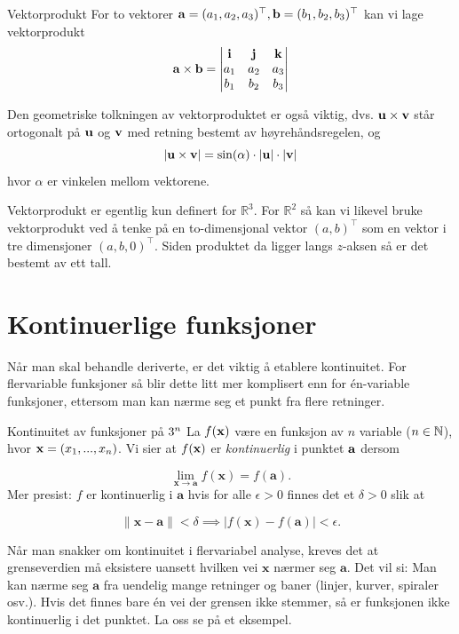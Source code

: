 \begin{defn}{Vektorprodukt}
For to vektorer $\mathbf{a}=(a_1,a_2,a_3)^\top,\mathbf{b}=(b_1,b_2,b_3)^\top$ kan vi lage vektorprodukt
\[\mathbf{a} \times \mathbf{b} = \begin{vmatrix}\mathbf{i} & \mathbf{j} & \mathbf{k} \\ a_1 & a_2 & a_3 \\ b_1 & b_2 & b_3 \end{vmatrix}\]
\label{defn:vektorprodukt}
\end{defn}

Den geometriske tolkningen av vektorproduktet er også viktig, dvs.
$\mathbf{u}\times \mathbf{v}$ står ortogonalt på $\mathbf{u}$ og $\mathbf{v}$  
med retning bestemt av høyrehåndsregelen, og
$$|\mathbf{u}\times\mathbf{v}| = \sin(\alpha)\cdot |\mathbf{u}|\cdot|\mathbf{v}|$$
hvor $\alpha$ er vinkelen mellom vektorene.

Vektorprodukt er egentlig kun definert for $\mathbb{R}^3$. For 
$\mathbb{R}^2$ så kan vi likevel bruke vektorprodukt ved å tenke 
på en to-dimensjonal vektor $(a,b)^\top$ som en vektor i tre 
dimensjoner $(a,b,0)^\top$. Siden produktet da ligger langs
$z$-aksen så er det bestemt av ett tall.



\section{Kontinuerlige funksjoner}
Når man skal behandle deriverte, er det viktig å etablere kontinuitet. For flervariable funksjoner så blir dette litt mer komplisert enn for én-variable funksjoner, ettersom man kan nærme seg et punkt fra flere retninger.

\begin{defn}{Kontinuitet av funksjoner på $3^n$}{}
La $f(\mathbf{x})$ være en funksjon av $n$ variable ($n\in\mathbb{N}$), hvor  $\mathbf{x}=(x_1,...,x_n)$. Vi sier at $f(\mathbf{x})$ er \textit{kontinuerlig} i punktet $\mathbf{a}$ dersom 

\[
\lim_{\mathbf{x} \to \mathbf{a}} f(\mathbf{x}) = f(\mathbf{a}).
\]
Mer presist: \(f\) er kontinuerlig i \(\mathbf{a}\) hvis for alle \(\epsilon > 0\) finnes det et \(\delta > 0\) slik at

\[
\|\mathbf{x} - \mathbf{a}\| < \delta \implies |f(\mathbf{x}) - f(\mathbf{a})| < \epsilon.
\]    
\end{defn}
Når man snakker om kontinuitet i flervariabel analyse, kreves det at grenseverdien må eksistere uansett hvilken vei \( \mathbf{x} \) nærmer seg \( \mathbf{a} \). Det vil si: Man kan nærme seg \( \mathbf{a} \) fra uendelig mange retninger og baner (linjer, kurver, spiraler osv.). Hvis det finnes bare én vei der grensen ikke stemmer, så er funksjonen ikke kontinuerlig i det punktet. La oss se på et eksempel.

